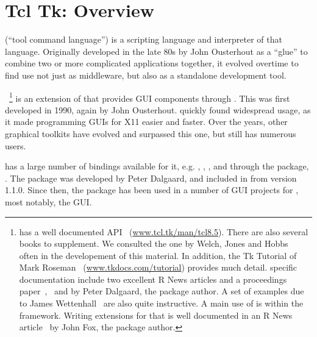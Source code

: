  
\newcommand{\Event}[1]{$<$#1$>$}
\newcommand{\VirtualEvent}[1]{$<<$#1$>>$}



\chapter{Tcl Tk: Overview}
\label{sec:tcltk:overview}

\TCL\/ (``tool command language'') is a scripting language and
interpreter of that language.  Originally developed in the late 80s by
John Ousterhout as a ``glue'' to combine two or more complicated
applications together, it evolved overtime to find use not just as
middleware, but also as a standalone development tool.

\TK~\footnote{
  \Tk{} has a well documented API~\citep{TclTk:Api}
  (\url{www.tcl.tk/man/tcl8.5}).  There are also several books
  to supplement. We consulted the one by Welch, Jones and
  Hobbs~\citep{beedub} often in the developement of this material. In
  addition, the Tk Tutorial of Mark Roseman~\citep{TclTk:Tutorial}
  (\url{www.tkdocs.com/tutorial}) provides much detail. \R{} specific
  documentation include two excellent R News
  articles and a proceedings paper~\citep{Rnews:Dalgaard:2001a},~\citep{Rnewse:Dalgaard:2002}
  and \citep{Dalgaard-DSC} by Peter Dalgaard, the
  package author. A set of examples due to James
  Wettenhall~\citep{Wettenhall} are also quite instructive. A main use
  of  is within the  framework. Writing
  extensions for that is well documented in an R News
  article~\citep{Rnews:Fox:2007} by John Fox, the package author.
}
 is an extension of \TCL\/ that provides GUI components through
\TCL.  This was first developed in 1990, again by John
Ousterhout. \TK\/ quickly found widespread usage, as it made
programming GUIs for X11 easier and faster. Over the years, other
graphical toolkits have evolved and surpassed this one, but \TK\/
still has numerous users.

\TK\/ has a large number of bindings available for it, e.g. , ,
, and through the  package, \R. The  package
was developed by Peter Dalgaard, and  included in \R\/ from version
1.1.0. Since then, the package has been used in a number of GUI 
projects for \R,  most notably, the  GUI.

